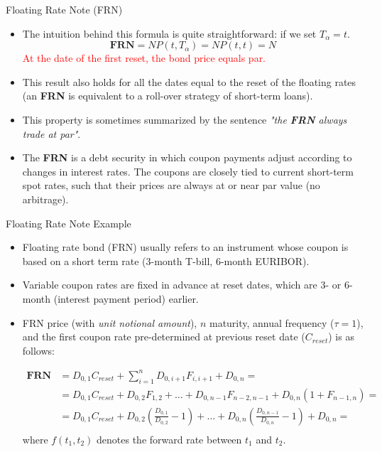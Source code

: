 \documentclass{beamer}
\begin{document}
\begin{frame}{Floating Rate Note (FRN)}
	\begin{itemize}
	\item The intuition behind this formula is quite straightforward: if we set $T_\alpha =t$. 
	\begin{equation*}
		\textbf{FRN} = N P(t, T_\alpha) = N P(t, t) = N
	\end{equation*}
	\textcolor{red}{At the date of the first reset, the bond price equals par.} 
	\item This result also holds for all the dates equal to the reset of the floating rates (an \textbf{FRN} is equivalent to a roll-over strategy of short-term loans).
	\item This property is sometimes summarized by the sentence \emph{"the \textbf{FRN} always trade at par"}.
	\item The \textbf{FRN} is a debt security in which coupon payments adjust according to changes in interest rates. The coupons are closely tied to current short-term spot rates, such that their prices are always at or near par value (no arbitrage). 
	\end{itemize}
\end{frame}

\begin{frame}{Floating Rate Note Example}
\begin{itemize}
\item Floating rate bond (FRN) usually refers to an instrument whose coupon is based on a short term rate (3-month T-bill, 6-month EURIBOR). 
\item Variable coupon rates are fixed in advance at reset dates, which are 3- or 6-month (interest payment period) earlier.
\item FRN price (with \emph{unit notional amount}), $n$ maturity, annual frequency ($\tau=1$), and the first coupon rate pre-determined at previous reset date ($C_{reset}$) is as follows:

\begin{equation*}
\begin{aligned}
\textbf{FRN} & = D_{0,1}C_{reset} + \sum_{i=1}^nD_{0,i+1}F_{i,i+1} + D_{0,n}= \\
& = D_{0,1}C_{reset} + D_{0,2}F_{1,2} + \ldots + D_{0,n-1}F_{n-2,n-1}+ D_{0,n}(1+F_{n-1,n}) = \\
& = D_{0,1}C_{reset} + D_{0,2}\left(\frac{D_{0,1}}{D_{0,2}}-1\right) + \ldots + D_{0,n}\left(\frac{D_{0,n-1}}{D_{0,n}}-1\right) + D_{0,n} = \\
\end{aligned}
\end{equation*}
where $f(t_1,t_2)$ denotes the forward rate between $t_1$ and $t_2$.
\end{itemize}
\end{frame}
\end{document}
